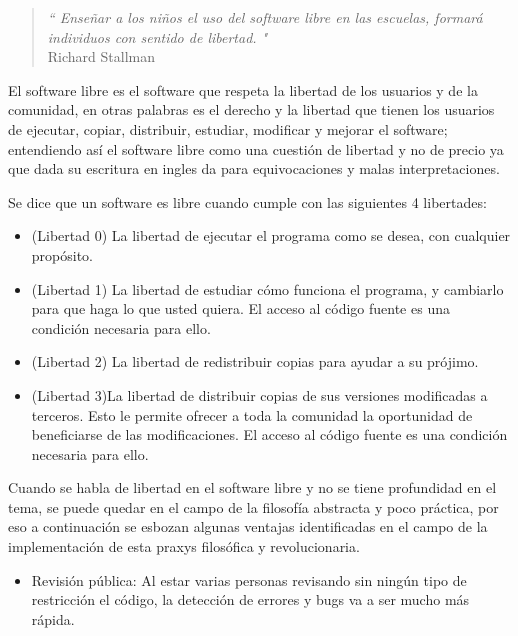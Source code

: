 \begin{multicols}{2}

\begin{quote}
\raggedleft
\textit{“ Enseñar a los niños el uso del software libre en las escuelas, formará individuos con sentido de libertad. "}\\
 Richard Stallman

\end{quote}

El software libre es el software que respeta la libertad de los usuarios y de la comunidad, en otras palabras es el derecho y la libertad que tienen los usuarios de ejecutar, copiar, distribuir, estudiar, modificar y mejorar el software; entendiendo así el software libre como una cuestión de libertad y no de precio ya que dada su escritura en ingles da para equivocaciones y malas interpretaciones.

Se dice que un software es libre cuando cumple con las siguientes 4 libertades:
\begin{itemize}
\item (Libertad 0) La libertad de ejecutar el programa como se desea, con cualquier propósito.
\item (Libertad 1) La libertad de estudiar cómo funciona el programa, y cambiarlo para que haga lo que usted quiera. El acceso al código fuente es una condición necesaria para ello.
\item (Libertad 2) La libertad de redistribuir copias para ayudar a su prójimo.
\item (Libertad 3)La libertad de distribuir copias de sus versiones modificadas a terceros. Esto le permite ofrecer a toda la comunidad la oportunidad de beneficiarse de las modificaciones. El acceso al código fuente es una condición necesaria para ello.
\end{itemize}




Cuando se habla de libertad en el software libre y no se tiene profundidad en el tema, se puede quedar en el campo de la filosofía abstracta y poco práctica, por eso a continuación se esbozan algunas ventajas identificadas en el campo de la implementación de esta praxys filosófica y revolucionaria.

\begin{itemize}
\item Revisión pública: Al estar varias personas revisando sin ningún tipo de restricción el código, la detección de errores y bugs va a ser mucho más rápida.



\end{itemize}
\end{multicols}
